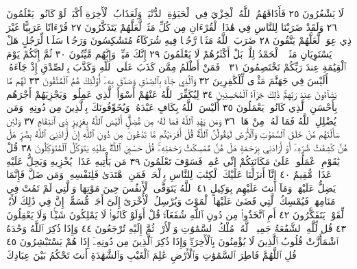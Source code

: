 لَا يَشْعُرُونَ ٢٥ فَأَذَاقَهُمُ ٱللَّهُ ٱلْخِزْيَ فِي ٱلْحَيَوٰةِ ٱلدُّنْيَاۖ وَلَعَذَابُ
ٱلْأٓخِرَةِ أَكْبَرُۚ لَوْ كَانُوا۟ يَعْلَمُونَ ٢٦ وَلَقَدْ ضَرَبْنَا لِلنَّاسِ فِي
هَٰذَا ٱلْقُرْءَانِ مِن كُلِّ مَثَلࣲ لَّعَلَّهُمْ يَتَذَكَّرُونَ ٢٧ قُرْءَانًا عَرَبِيًّا
غَيْرَ ذِي عِوَجࣲ لَّعَلَّهُمْ يَتَّقُونَ ٢٨ ضَرَبَ ٱللَّهُ مَثَلࣰا رَّجُلࣰا فِيهِ
شُرَكَآءُ مُتَشَٰكِسُونَ وَرَجُلࣰا سَلَمࣰا لِّرَجُلٍ هَلْ يَسْتَوِيَانِ مَثَلًاۚ
ٱلْحَمْدُ لِلَّهِۚ بَلْ أَكْثَرُهُمْ لَا يَعْلَمُونَ ٢٩ إِنَّكَ مَيِّتࣱ وَإِنَّهُم
مَّيِّتُونَ ٣٠ ثُمَّ إِنَّكُمْ يَوْمَ ٱلْقِيَٰمَةِ عِندَ رَبِّكُمْ تَخْتَصِمُونَ ٣١
۞ فَمَنْ أَظْلَمُ مِمَّن كَذَبَ عَلَى ٱللَّهِ وَكَذَّبَ بِٱلصِّدْقِ
إِذْ جَآءَهُۥٓۚ أَلَيْسَ فِي جَهَنَّمَ مَثْوࣰى لِّلْكَٰفِرِينَ ٣٢ وَٱلَّذِي
جَآءَ بِٱلصِّدْقِ وَصَدَّقَ بِهِۦٓ أُو۟لَٰٓئِكَ هُمُ ٱلْمُتَّقُونَ ٣٣
لَهُم مَّا يَشَآءُونَ عِندَ رَبِّهِمْۚ ذَٰلِكَ جَزَآءُ ٱلْمُحْسِنِينَ ٣٤
لِيُكَفِّرَ ٱللَّهُ عَنْهُمْ أَسْوَأَ ٱلَّذِي عَمِلُوا۟ وَيَجْزِيَهُمْ أَجْرَهُم
بِأَحْسَنِ ٱلَّذِي كَانُوا۟ يَعْمَلُونَ ٣٥ أَلَيْسَ ٱللَّهُ بِكَافٍ
عَبْدَهُۥۖ وَيُخَوِّفُونَكَ بِٱلَّذِينَ مِن دُونِهِۦۚ وَمَن يُضْلِلِ ٱللَّهُ
فَمَا لَهُۥ مِنْ هَادࣲ ٣٦ وَمَن يَهْدِ ٱللَّهُ فَمَا لَهُۥ مِن مُّضِلٍّۗ
أَلَيْسَ ٱللَّهُ بِعَزِيزࣲ ذِي ٱنتِقَامࣲ ٣٧ وَلَئِن سَأَلْتَهُم مَّنْ خَلَقَ
ٱلسَّمَٰوَٰتِ وَٱلْأَرْضَ لَيَقُولُنَّ ٱللَّهُۚ قُلْ أَفَرَءَيْتُم مَّا تَدْعُونَ
مِن دُونِ ٱللَّهِ إِنْ أَرَادَنِيَ ٱللَّهُ بِضُرٍّ هَلْ هُنَّ كَٰشِفَٰتُ
ضُرِّهِۦٓ أَوْ أَرَادَنِي بِرَحْمَةٍ هَلْ هُنَّ مُمْسِكَٰتُ رَحْمَتِهِۦۚ
قُلْ حَسْبِيَ ٱللَّهُۖ عَلَيْهِ يَتَوَكَّلُ ٱلْمُتَوَكِّلُونَ ٣٨ قُلْ يَٰقَوْمِ
ٱعْمَلُوا۟ عَلَىٰ مَكَانَتِكُمْ إِنِّي عَٰمِلࣱۖ فَسَوْفَ تَعْلَمُونَ ٣٩
مَن يَأْتِيهِ عَذَابࣱ يُخْزِيهِ وَيَحِلُّ عَلَيْهِ عَذَابࣱ مُّقِيمٌ ٤٠
إِنَّآ أَنزَلْنَا عَلَيْكَ ٱلْكِتَٰبَ لِلنَّاسِ بِٱلْحَقِّۖ فَمَنِ ٱهْتَدَىٰ
فَلِنَفْسِهِۦۖ وَمَن ضَلَّ فَإِنَّمَا يَضِلُّ عَلَيْهَاۖ وَمَآ أَنتَ عَلَيْهِم
بِوَكِيلٍ ٤١ ٱللَّهُ يَتَوَفَّى ٱلْأَنفُسَ حِينَ مَوْتِهَا وَٱلَّتِي
لَمْ تَمُتْ فِي مَنَامِهَاۖ فَيُمْسِكُ ٱلَّتِي قَضَىٰ عَلَيْهَا ٱلْمَوْتَ
وَيُرْسِلُ ٱلْأُخْرَىٰٓ إِلَىٰٓ أَجَلࣲ مُّسَمًّىۚ إِنَّ فِي ذَٰلِكَ لَأٓيَٰتࣲ لِّقَوْمࣲ
يَتَفَكَّرُونَ ٤٢ أَمِ ٱتَّخَذُوا۟ مِن دُونِ ٱللَّهِ شُفَعَآءَۚ قُلْ
أَوَلَوْ كَانُوا۟ لَا يَمْلِكُونَ شَيْـࣰٔا وَلَا يَعْقِلُونَ ٤٣ قُل
لِّلَّهِ ٱلشَّفَٰعَةُ جَمِيعࣰاۖ لَّهُۥ مُلْكُ ٱلسَّمَٰوَٰتِ وَٱلْأَرْضِۖ ثُمَّ
إِلَيْهِ تُرْجَعُونَ ٤٤ وَإِذَا ذُكِرَ ٱللَّهُ وَحْدَهُ ٱشْمَأَزَّتْ
قُلُوبُ ٱلَّذِينَ لَا يُؤْمِنُونَ بِٱلْأٓخِرَةِۖ وَإِذَا ذُكِرَ ٱلَّذِينَ مِن
دُونِهِۦٓ إِذَا هُمْ يَسْتَبْشِرُونَ ٤٥ قُلِ ٱللَّهُمَّ فَاطِرَ ٱلسَّمَٰوَٰتِ
وَٱلْأَرْضِ عَٰلِمَ ٱلْغَيْبِ وَٱلشَّهَٰدَةِ أَنتَ تَحْكُمُ بَيْنَ عِبَادِكَ
